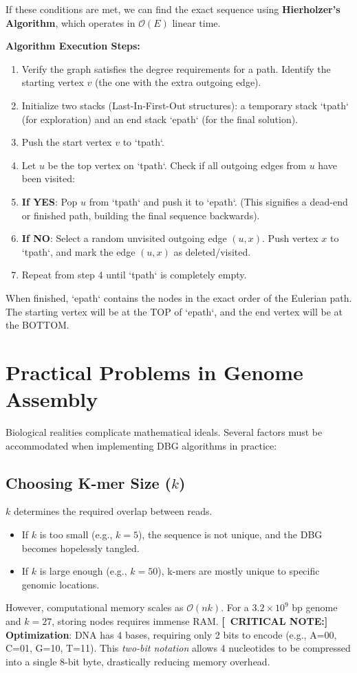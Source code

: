 \documentclass[11pt,a4paper]{article}
\newcommand{\sta}{\textbf{[\textasteriskcentered\ CRITICAL NOTE:] }}
\begin{document}
If these conditions are met, we can find the exact sequence using \textbf{Hierholzer's Algorithm}, which operates in $\mathcal{O}(E)$ linear time.

\textbf{Algorithm Execution Steps:}
\begin{enumerate}
    \item Verify the graph satisfies the degree requirements for a path. Identify the starting vertex $v$ (the one with the extra outgoing edge).
    \item Initialize two stacks (Last-In-First-Out structures): a temporary stack `tpath` (for exploration) and an end stack `epath` (for the final solution).
    \item Push the start vertex $v$ to `tpath`.
    \item Let $u$ be the top vertex on `tpath`. Check if all outgoing edges from $u$ have been visited:
    \item \textbf{If YES}: Pop $u$ from `tpath` and push it to `epath`. (This signifies a dead-end or finished path, building the final sequence backwards).
    \item \textbf{If NO}: Select a random unvisited outgoing edge $(u,x)$. Push vertex $x$ to `tpath`, and mark the edge $(u,x)$ as deleted/visited.
    \item Repeat from step 4 until `tpath` is completely empty.
\end{enumerate}

When finished, `epath` contains the nodes in the exact order of the Eulerian path. The starting vertex will be at the TOP of `epath`, and the end vertex will be at the BOTTOM.

\section{Practical Problems in Genome Assembly}

Biological realities complicate mathematical ideals. Several factors must be accommodated when implementing DBG algorithms in practice:

\subsection{Choosing K-mer Size ($k$)}
$k$ determines the required overlap between reads. 
\begin{itemize}
    \item If $k$ is too small (e.g., $k=5$), the sequence is not unique, and the DBG becomes hopelessly tangled. 
    \item If $k$ is large enough (e.g., $k=50$), k-mers are mostly unique to specific genomic locations. 
\end{itemize}
However, computational memory scales as $\mathcal{O}(nk)$. For a $3.2 \times 10^9$ bp genome and $k=27$, storing nodes requires immense RAM. 
\sta \textbf{Optimization}: DNA has 4 bases, requiring only 2 bits to encode (e.g., A=00, C=01, G=10, T=11). This \textit{two-bit notation} allows 4 nucleotides to be compressed into a single 8-bit byte, drastically reducing memory overhead.
\end{document}
